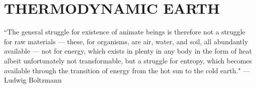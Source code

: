 \section{THERMODYNAMIC EARTH}

``The general struggle for existence of animate beings is therefore not a struggle for raw materials --- these, for organisms, are air, water, and soil, all abundantly available --- not for energy, which exists in plenty in any body in the form of heat albeit unfortunately not transformable, but a struggle for entropy, which becomes available through the transition of energy from the hot sun to the cold earth." --- Ludwig Boltzmann

